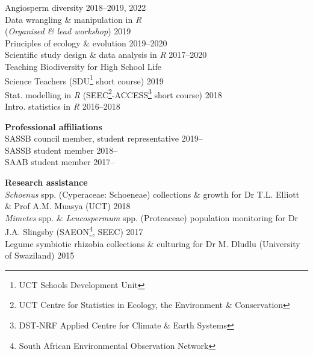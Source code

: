 \documentclass[10pt]{article}
\begin{document}
\begin{multicols}{2}
Angiosperm diversity                         \hfill {\small 2018--2019, 2022} \\
Data wrangling \& manipulation in \textit{R} \\
\hspace{2em} (\textit{Organised \& lead
  workshop})                                 \hfill {\small             2019} \\
Principles of ecology \& evolution           \hfill {\small       2019--2020} \\
Scientific study design \& data analysis in
  \textit{R}                                 \hfill {\small       2017--2020} \\
Teaching Biodiversity for High School Life \\
\hspace{2em} Science Teachers {\small
  (SDU\footnote{UCT Schools Development Unit}
  short course)}                             \hfill {\small             2019} \\
Stat. modelling in \textit{R} {\small
  (SEEC\footnote{UCT Centre for Statistics in
  Ecology, the Environment \&
  Conservation}-ACCESS\footnote{DST-NRF
  Applied Centre for Climate \& Earth Systems}
  short course)}                             \hfill {\small             2018} \\
Intro. statistics in \textit{R}              \hfill {\small       2016--2018}

\textbf{Professional affiliations}\\ %

SASSB council member, student representative           \hfill {\small 2019--} \\
SASSB student member                                   \hfill {\small 2018--} \\
SAAB student member                                    \hfill {\small 2017--}

\end{multicols}

\textbf{Research assistance}\\ %

\textit{Schoenus} spp. (Cyperaceae: Schoeneae)
  collections \& growth for Dr T.L. Elliott \& Prof A.M.
  Muasya {\small (UCT)}                                  \hfill {\small 2018} \\
\textit{Mimetes} spp. \& \textit{Leucospermum} spp.
  (Proteaceae) population monitoring for Dr J.A. Slingsby
  {\small (SAEON\footnote{South African Environmental
  Observation Network}, SEEC)}                           \hfill {\small 2017} \\
Legume symbiotic rhizobia collections \& culturing for
  Dr M. Dludlu {\small (University of Swaziland)}        \hfill {\small 2015}
\end{document}
